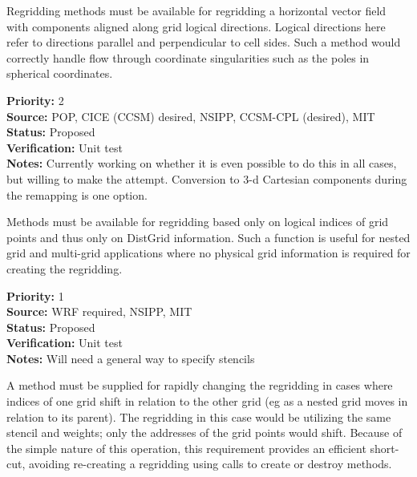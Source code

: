 Regridding methods must be available for regridding a horizontal
vector field with components aligned along grid logical directions.
Logical directions here refer to directions parallel and perpendicular
to cell sides.  Such a method would correctly handle flow through 
coordinate singularities such as the poles in spherical coordinates.

\begin{reqlist}
{\bf Priority:} 2 \\
{\bf Source:}  POP, CICE (CCSM) desired, NSIPP, CCSM-CPL (desired), MIT \\
{\bf Status:} Proposed \\
{\bf Verification:} Unit test \\
{\bf Notes:} Currently working on whether it is even possible to do this
             in all cases, but willing to make the attempt.  Conversion to
             3-d Cartesian components during the remapping is one option.
\end{reqlist}


Methods must be available for regridding based
only on logical indices of grid points and thus only on DistGrid information.  
Such a function is useful for nested grid and multi-grid applications where 
no physical grid information is required for creating the regridding.

\begin{reqlist}
{\bf Priority:} 1 \\
{\bf Source:}  WRF required, NSIPP, MIT \\
{\bf Status:} Proposed \\
{\bf Verification:} Unit test \\
{\bf Notes:} Will need a general way to specify stencils
\end{reqlist}


A method must be supplied for rapidly changing the
regridding in cases where indices of one grid shift in relation 
to the other grid (eg as a nested grid moves in relation to its 
parent).  The regridding in this case would be utilizing the
same stencil and weights; only the addresses of the grid points
would shift.  Because of the simple nature of this operation,
this requirement provides an efficient short-cut, avoiding
re-creating a regridding using calls to create or destroy methods.

